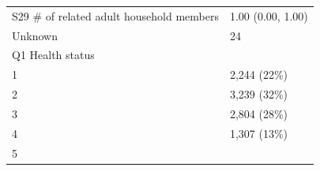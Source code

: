 \documentclass[]{article}
\begin{document}
\begin{longtable}[]{@{}ll@{}}
\begin{minipage}[t]{0.71\columnwidth}\raggedright
S29 \# of related adult household members\strut
\end{minipage} & \begin{minipage}[t]{0.23\columnwidth}\raggedright
1.00 (0.00, 1.00)\strut
\end{minipage}\tabularnewline
\begin{minipage}[t]{0.71\columnwidth}\raggedright
Unknown\strut
\end{minipage} & \begin{minipage}[t]{0.23\columnwidth}\raggedright
24\strut
\end{minipage}\tabularnewline
\begin{minipage}[t]{0.71\columnwidth}\raggedright
Q1 Health status\strut
\end{minipage} & \begin{minipage}[t]{0.23\columnwidth}\raggedright
\strut
\end{minipage}\tabularnewline
\begin{minipage}[t]{0.71\columnwidth}\raggedright
1\strut
\end{minipage} & \begin{minipage}[t]{0.23\columnwidth}\raggedright
2,244 (22\%)\strut
\end{minipage}\tabularnewline
\begin{minipage}[t]{0.71\columnwidth}\raggedright
2\strut
\end{minipage} & \begin{minipage}[t]{0.23\columnwidth}\raggedright
3,239 (32\%)\strut
\end{minipage}\tabularnewline
\begin{minipage}[t]{0.71\columnwidth}\raggedright
3\strut
\end{minipage} & \begin{minipage}[t]{0.23\columnwidth}\raggedright
2,804 (28\%)\strut
\end{minipage}\tabularnewline
\begin{minipage}[t]{0.71\columnwidth}\raggedright
4\strut
\end{minipage} & \begin{minipage}[t]{0.23\columnwidth}\raggedright
1,307 (13\%)\strut
\end{minipage}\tabularnewline
\begin{minipage}[t]{0.71\columnwidth}\raggedright
5\strut
\end{minipage} & \begin{minipage}[t]{0.23\columnwidth}\raggedright

\end{minipage}
\end{longtable}
\end{document}
